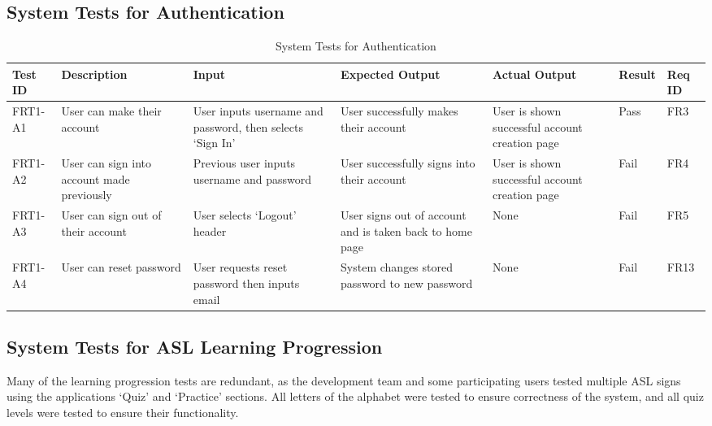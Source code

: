 \documentclass[12pt, titlepage]{article}
\begin{document}
\subsection{System Tests for Authentication}
\begin{longtable}{|p{1cm}|p{2.5cm}|p{2cm}|p{2cm}|p{2cm}|p{1.5cm}|p{1cm}|}
\caption{System Tests for Authentication} \\
\hline
\textbf{Test ID} & \textbf{Description} & \textbf{Input} & \textbf{Expected Output} & \textbf{Actual Output} & \textbf{Result} & \textbf{Req ID}\\
\hline
FRT1-A1 & User can make their account & User inputs username and password, then selects `Sign In' & User successfully makes their account & User is shown successful account creation page & Pass & FR3\\
\hline
FRT1-A2 & User can sign into account made previously & Previous user inputs username and password & User successfully signs into their account & User is shown successful account creation page & Fail & FR4 \\
\hline
FRT1-A3 & User can sign out of their account & User selects `Logout' header & User signs out of account and is taken back to home page & None & Fail & FR5 \\
\hline
FRT1-A4 & User can reset password & User requests reset password then inputs email & System changes stored password to new password & None & Fail & FR13 \\
\bottomrule
\end{longtable}

\subsection{System Tests for ASL Learning Progression}

Many of the learning progression tests are redundant, as the development team and some participating users tested multiple ASL signs using the applications `Quiz' and `Practice' sections. All letters of the alphabet were tested to ensure correctness of the system, and all quiz levels were tested to ensure their functionality. 
\end{document}
